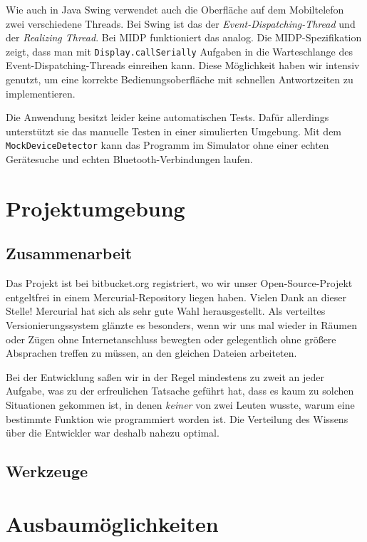 \documentclass[ngerman]{article}
\begin{document}
Wie auch in Java Swing verwendet auch die Oberfläche auf dem Mobiltelefon zwei
verschiedene Threads. Bei Swing ist das der \textit{Event-Dispatching-Thread}
und der \textit{Realizing Thread}.  Bei MIDP funktioniert das analog. Die
MIDP-Spezifikation zeigt, dass man mit {\tt Display.callSerially} Aufgaben in
die Warteschlange des Event-Dispatching-Threads einreihen kann. Diese
Möglichkeit haben wir intensiv genutzt, um eine korrekte Bedienungsoberfläche
mit schnellen Antwortzeiten zu implementieren.

Die Anwendung besitzt leider keine automatischen Tests. Dafür allerdings
unterstützt sie das manuelle Testen in einer simulierten Umgebung. Mit
dem {\tt MockDeviceDetector} kann das Programm im Simulator ohne
einer echten Ge\-rä\-te\-suche und echten Bluetooth-Verbindungen laufen.

\section{Projektumgebung}

\subsection{Zusammenarbeit}

Das Projekt ist bei bitbucket.org registriert, wo wir unser Open-Source-Projekt
entgeltfrei in einem Mercurial-Repository liegen haben. Vielen Dank an dieser
Stelle!  Mercurial hat sich als sehr gute Wahl herausgestellt. Als verteiltes
Versionierungssystem glänzte es besonders, wenn wir uns mal wieder in Räumen
oder Zügen ohne Internetanschluss bewegten oder gelegentlich ohne größere
Absprachen treffen zu müssen, an den gleichen Dateien arbeiteten.

Bei der Entwicklung saßen wir in der Regel mindestens zu zweit an jeder
Aufgabe, was zu der erfreulichen Tatsache geführt hat, dass es kaum zu solchen
Situationen gekommen ist, in denen \textit{keiner} von zwei Leuten wusste,
warum eine bestimmte Funktion wie programmiert worden ist. Die Verteilung des
Wissens über die Entwickler war deshalb nahezu optimal.

\subsection{Werkzeuge}

\section{Ausbaumöglichkeiten}
\end{document}
